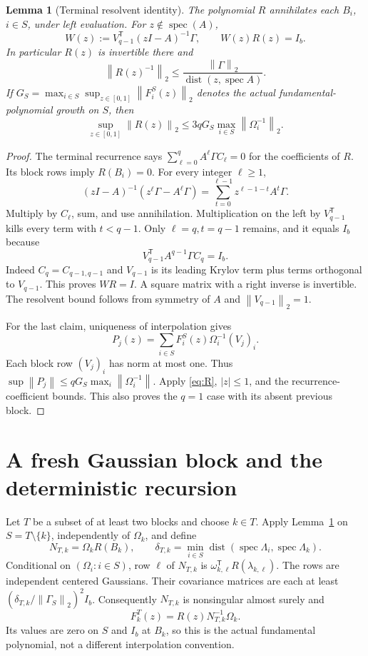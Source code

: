 \documentclass[11pt]{article}
\newtheorem{lemma}[theorem]{Lemma}
\newcommand{\norm}[1]{\left\lVert#1\right\rVert}
\begin{document}
\begin{lemma}[Terminal resolvent identity]\label{lem:resolvent}
The polynomial $R$ annihilates each $B_i$, $i\in S$, under left
evaluation. For $z\notin\operatorname{spec}(A)$,
\[
 W(z):=V_{q-1}^{\mathsf T}(zI-A)^{-1}\Gamma,
 \qquad W(z)R(z)=I_b.
\]
In particular $R(z)$ is invertible there and
\[
 \norm{R(z)^{-1}}_2\leq
 \frac{\norm\Gamma_2}{\operatorname{dist}(z,\operatorname{spec}A)}.
\]
If $G_S=\max_{i\in S}\sup_{z\in[0,1]}\norm{F_i^S(z)}_2$ denotes
the actual fundamental-polynomial growth on $S$, then
\[
 \sup_{z\in[0,1]}\norm{R(z)}_2
       \leq3qG_S\max_{i\in S}\norm{\Omega_i^{-1}}_2.
\]
\end{lemma}
\begin{proof}
The terminal recurrence says $\sum_{\ell=0}^qA^\ell\Gamma C_\ell=0$
for the coefficients of $R$. Its block rows imply $R(B_i)=0$.
For every integer $\ell\geq1$,
\[
 (zI-A)^{-1}(z^\ell\Gamma-A^\ell\Gamma)
       =\sum_{t=0}^{\ell-1}z^{\ell-1-t}A^t\Gamma.
\]
Multiply by $C_\ell$, sum, and use annihilation. Multiplication on the
left by $V_{q-1}^{\mathsf T}$ kills every term with $t<q-1$.
Only $\ell=q,t=q-1$ remains, and it equals $I_b$ because
\[
 V_{q-1}^{\mathsf T}A^{q-1}\Gamma C_q=I_b.
\]
Indeed $C_q=C_{q-1,q-1}$ and $V_{q-1}$ is its leading Krylov term plus
terms orthogonal to $V_{q-1}$. This proves $WR=I$. A square matrix with
a right inverse is invertible. The resolvent bound follows from symmetry
of $A$ and $\norm{V_{q-1}}_2=1$.

For the last claim, uniqueness of interpolation gives
\[
 P_j(z)=\sum_{i\in S}F_i^S(z)\Omega_i^{-1}(V_j)_i.
\]
Each block row $(V_j)_i$ has norm at most one. Thus
$\sup\norm{P_j}\leq qG_S\max_i\norm{\Omega_i^{-1}}$.
Apply \eqref{eq:R}, $|z|\leq1$, and the recurrence-coefficient bounds.
This also proves the $q=1$ case with its absent previous block.
\end{proof}

\section{A fresh Gaussian block and the deterministic recursion}
Let $T$ be a subset of at least two blocks and choose $k\in T$.
Apply Lemma~\ref{lem:resolvent} on $S=T\setminus\{k\}$, independently
of $\Omega_k$, and define
\[
 N_{T,k}=\Omega_k R(B_k),\qquad
 \delta_{T,k}=\min_{i\in S}\operatorname{dist}
                 (\operatorname{spec}\Lambda_i,\operatorname{spec}\Lambda_k).
\]
Conditional on $(\Omega_i:i\in S)$, row $\ell$ of $N_{T,k}$ is
$\omega_{k,\ell}^{\mathsf T}R(\lambda_{k,\ell})$.
The rows are independent centered Gaussians. Their covariance matrices
are each at least $(\delta_{T,k}/\norm{\Gamma_S}_2)^2I_b$.
Consequently $N_{T,k}$ is nonsingular almost surely and
\begin{equation}\label{eq:fresh}
 F_k^T(z)=R(z)N_{T,k}^{-1}\Omega_k.
\end{equation}
Its values are zero on $S$ and $I_b$ at $B_k$, so this is the actual
fundamental polynomial, not a different interpolation convention.
\end{document}
